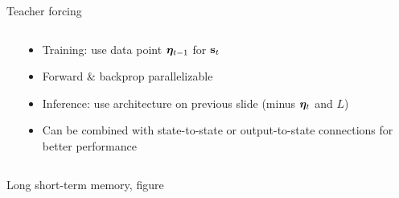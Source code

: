 \begin{frame}{Teacher forcing}
    \begin{columns}
        \begin{column}{0.71\textwidth}
            
            
        \end{column}
        \begin{column}{0.29\textwidth}
            \begin{itemize}
                \item Training: use data point $\bm{\eta}_{t-1}$ for $\mathbf{s}_t$
                \item Forward \& backprop parallelizable
                \item Inference: use architecture on previous slide (minus $\bm{\eta}_t$ and $L$)
                \item Can be combined with state-to-state or output-to-state connections for better performance
            \end{itemize}
        \end{column}
    \end{columns}
\end{frame}

\begin{frame}{Long short-term memory, figure}
    \begin{center}
        \vspace{-4mm}
        
        \vspace{-7mm}
    \end{center}
\end{frame}

